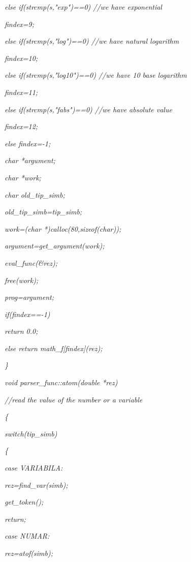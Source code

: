 \documentclass[a4paper,twoside]{book}
\begin{document}
\textit{\qquad else if(strcmp(s,"exp")==0) //we have exponential}

\textit{\qquad \qquad findex=9;}

\textit{\qquad else if(strcmp(s,"log")==0) //we have natural logarithm}

\textit{\qquad \qquad findex=10;}

\textit{\qquad else if(strcmp(s,"log10")==0) //we have 10 base logarithm}

\textit{\qquad \qquad findex=11;}

\textit{\qquad else if(strcmp(s,"fabs")==0) //we have absolute value}

\textit{\qquad \qquad findex=12;}

\textit{\qquad else findex=-1;}

\textit{\qquad char *argument;}

\textit{\qquad char *work;}

\textit{\qquad char old\_tip\_simb;}

\textit{\qquad old\_tip\_simb=tip\_simb;\qquad }

\textit{\qquad work=(char *)calloc(80,sizeof(char));}

\textit{\qquad argument=get\_argument(work);}

\textit{\qquad eval\_func(\&rez);}

\textit{\qquad free(work);}

\textit{\qquad prog=argument;}

\textit{\qquad if(findex==-1)}

\textit{\qquad \qquad return 0.0;}

\textit{\qquad else return math\_f[findex](rez);}

\textit{\}}

\textit{void parser\_func::atom(double *rez)}

\textit{//read the value of the number or a variable}

\textit{\{}

\textit{\qquad switch(tip\_simb)}

\textit{\qquad \{}

\textit{\qquad case VARIABILA:}

\textit{\qquad \qquad *rez=find\_var(simb);}

\textit{\qquad \qquad get\_token();}

\textit{\qquad \qquad return;}

\textit{\qquad case NUMAR:}

\textit{\qquad \qquad *rez=atof(simb);}
\end{document}
